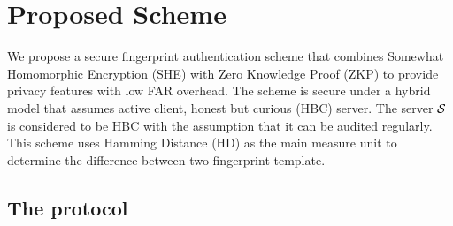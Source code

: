 \section{Proposed Scheme}
We propose a secure fingerprint authentication scheme that combines Somewhat
Homomorphic Encryption (SHE) with Zero Knowledge Proof (ZKP) to provide privacy
features with low FAR overhead. The scheme is secure under a hybrid model that
assumes active client,
honest but curious (HBC) server. The server $\mathcal{S}$ is considered to be HBC
with the assumption that it can be audited regularly. This scheme uses Hamming
Distance (HD) as the main measure unit to determine the difference between two
fingerprint template.

\subsection{The protocol}
\label{sec:theProtocol}
